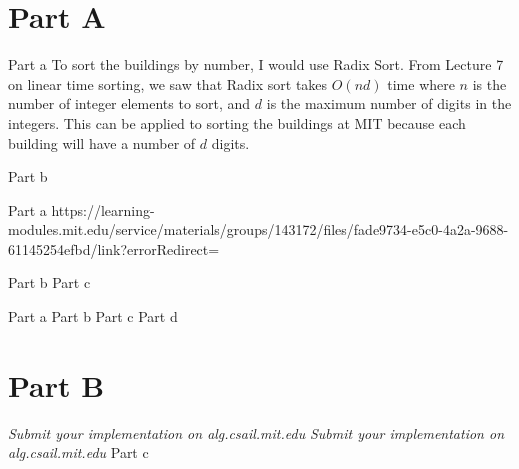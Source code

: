 \documentclass[12pt,twoside]{article}
\begin{document}

\begin{problems}

\section*{Part A}

\problem  %

\begin{problemparts}
\problempart Part a  To sort the buildings by number, I would use Radix Sort. From Lecture 7 on linear time sorting, we saw that Radix sort takes $O(nd)$ time where $n$ is the number of integer elements to sort, and $d$ is the maximum number of digits in the integers. This can be applied to sorting the buildings at MIT because each building will have a number of $d$ digits.

\problempart Part b  %
\end{problemparts}

\problem  %

\begin{problemparts}
\problempart Part a https://learning-modules.mit.edu/service/materials/groups/143172/files/fade9734-e5c0-4a2a-9688-61145254efbd/link?errorRedirect=%


\problempart Part b %
\problempart Part c %
\end{problemparts}

\problem  %

\begin{problemparts}
\problempart Part a %
\problempart Part b %
\problempart Part c %
\problempart Part d %
\end{problemparts}

\section*{Part B}

\problem
\begin{problemparts}
\problempart \emph{Submit your implementation on alg.csail.mit.edu}
\problempart \emph{Submit your implementation on alg.csail.mit.edu}
\problempart Part c %
\end{problemparts}

\end{problems}
\end{document}
